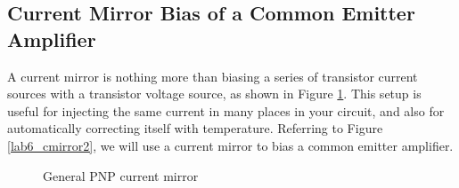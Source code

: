 \documentclass{article}
\begin{document}
\subsection{Current Mirror Bias of a Common Emitter Amplifier}
A current mirror is nothing more than biasing a series of transistor current sources with a transistor voltage source, as shown in Figure \ref{lab6_cmirror1}. This setup is useful for injecting the same current in many places in your circuit, and also for automatically correcting itself with temperature. Referring to Figure \ref{lab6_cmirror2}, we will use a current mirror to bias a common emitter amplifier.

	\begin{figure}[!htb]
		
		\centerline{\box\graph}
		\caption{General PNP current mirror}
		\label{lab6_cmirror1}
	\end{figure}
\end{document}
